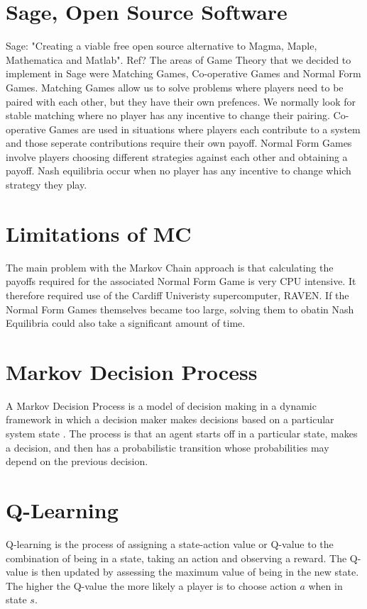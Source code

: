 \documentclass[a0,landscape]{a0poster}
\begin{document}
\begin{multicols}{2}
\color{Brown}
\section*{Sage, Open Source Software}
Sage: "Creating a viable free open source alternative to Magma, Maple, Mathematica and Matlab".
Ref?
The areas of Game Theory that we decided to implement in Sage were Matching Games, Co-operative Games and Normal Form Games.
Matching Games allow us to solve problems where players need to be paired with each other, but they have their own prefences.
We normally look for stable matching where no player has any incentive to change their pairing.
Co-operative Games are used in situations where players each contribute to a system and those seperate contributions require their own payoff.
Normal Form Games involve players choosing different strategies against each other and obtaining a payoff.
Nash equilibria occur when no player has any incentive to change which strategy they play.


\color{Olive}
\section*{Limitations of MC}
The main problem with the Markov Chain approach is that calculating the payoffs required for the associated Normal Form Game is very CPU intensive.
It therefore required use of the Cardiff Univeristy supercomputer, RAVEN.
If the Normal Form Games themselves became too large, solving them to obatin Nash Equilibria could also take a significant amount of time.


\color{SteelBlue}
\section*{Markov Decision Process}
A Markov Decision Process is a model of decision making in a dynamic framework in which a decision maker makes decisions based on a particular system state \cite{puterman2009markov}.
The process is that an agent starts off in a particular state, makes a decision, and then has a probabilistic transition whose probabilities may depend on the previous decision.

\section*{Q-Learning}
Q-learning is the process of assigning a state-action value or Q-value to the combination of being in a state, taking an action and observing a reward.
The Q-value is then updated by assessing the maximum value of being in the new state.
The higher the Q-value the more likely a player is to choose action $a$ when in state $s$.

\end{multicols}
\end{document}
